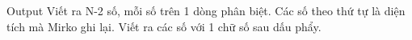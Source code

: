 Output
Viết ra N-2 số, mỗi số trên 1 dòng phân biệt. Các số theo thứ tự là diện tích mà Mirko ghi lại. Viết ra các số với 1 chữ số sau dấu phẩy.